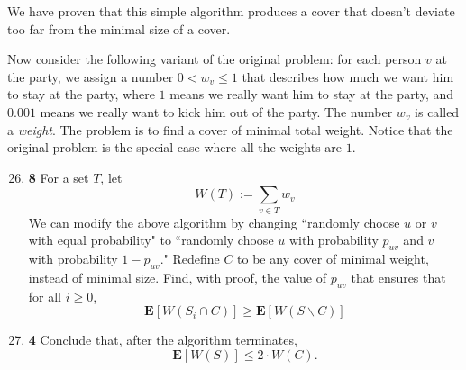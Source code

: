 \documentclass[12pt]{article}
\theoremstyle{plain}
\theoremstyle{definition}
\theoremstyle{remark}
\newcommand{\E}{\textbf{E}}
\newcommand{\pts}[1]{\lbrack\textbf{#1}\rbrack}
\begin{document}
We have proven that this simple algorithm produces a cover that doesn't deviate too far from the minimal size of a cover.

Now consider the following variant of the original problem: for each person $v$ at the party, we assign a number $0<w_v\le1$ that describes how much we want him to stay at the party, where $1$ means we really want him to stay at the party, and $0.001$ means we really want to kick him out of the party. The number $w_v$ is called a \emph{weight}. The problem is to find a cover of minimal total weight. Notice that the original problem is the special case where all the weights are $1$.

\begin{enumerate}
\setcounter{enumi}{25}
\item \pts{8} For a set $T$, let \[W(T):=\sum_{v\in T}w_v\] We can modify the above algorithm by changing ``randomly choose $u$ or $v$ with equal probability" to ``randomly choose $u$ with probability $p_{uv}$ and $v$ with probability $1-p_{uv}$." Redefine $C$ to be any cover of minimal weight, instead of minimal size. Find, with proof, the value of $p_{uv}$ that ensures that for all $i\ge0$, \[\E[W(S_i\cap C)]\ge\E[W(S\backslash C)]\]

\begin{comment}\begin{tcolorbox}
Let $p_{uv}:=\frac{w_v}{w_u+w_v}$. Then the left-hand side has probability at least $\frac{w_uw_v}{w_u+w_v}$ of increasing by $1$, whereas the right-hand side has probability at most $\frac{w_uw_v}{w_u+w_v}$ of increasing by $1$.
\end{tcolorbox}\end{comment}

\item \pts{4} Conclude that, after the algorithm terminates, \[\E[W(S)]\le2\cdot W(C).\]

\begin{comment}\begin{tcolorbox}
We have \[\E[W(S)]=\E[W(S\backslash C)]+\E[W(S\cap C)]\le2\cdot\E[W(S\cap C)]\le2\cdot W(C)\]
\end{tcolorbox}\end{comment}
\end{enumerate}
\end{document}
